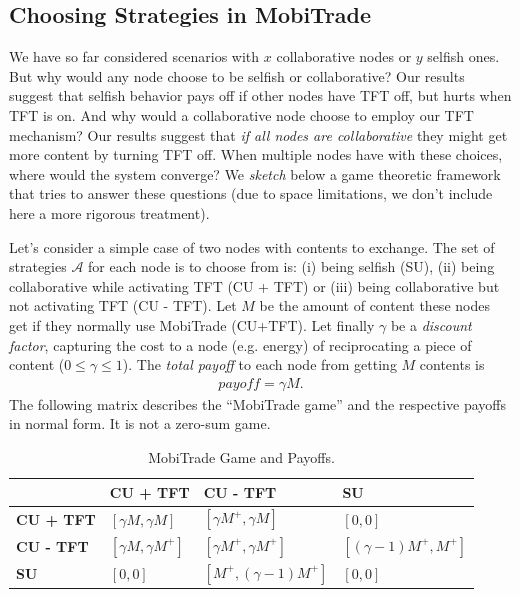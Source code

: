 \subsection{Choosing Strategies in MobiTrade}
\label{game}

We have so far considered scenarios with $x$ collaborative nodes or $y$ selfish ones. But why would any node choose to be selfish or collaborative? Our results suggest that selfish behavior pays off if other nodes have TFT off, but hurts when TFT is on. And why would a collaborative node choose to employ our TFT mechanism? Our results suggest that \emph{if all nodes are collaborative} they might get more content by turning TFT off. When multiple nodes have with these choices, where would the system converge? We \emph{sketch} below a game theoretic framework that tries to answer these questions (due to space limitations, we don't include here a more rigorous treatment).

Let's consider a simple case of two nodes with contents to exchange. The set of strategies $\mathcal{A}$ for each node is to choose from is: (i) being selfish (SU), (ii) being collaborative while activating TFT (CU + TFT) or (iii) being collaborative but not activating TFT (CU - TFT). Let $M$ be the amount of content these nodes get if they normally use MobiTrade (CU+TFT). Let finally $\gamma$ be a \emph{discount factor}, capturing the cost to a node (e.g. energy) of reciprocating a piece of content ($ 0 \le \gamma \le 1$).  The \emph{total payoff} to each node from getting $M$ contents is
\begin{eqnarray*}
payoff = \gamma M.
\end{eqnarray*}
The following matrix describes the ``MobiTrade game'' and the respective payoffs in normal form. It is not a zero-sum game.

\begin{table}[!h]
\vspace{-0.1in}
\caption{MobiTrade Game and Payoffs.}
\centering
\label{table:game}
\footnotesize
\begin{tabular}{|p{2cm}|p{2cm}|p{3cm}|p{3cm}|}
\hline
\bfseries & \bfseries CU + TFT & \bfseries CU - TFT  & \bfseries SU\\
\hline
\bfseries CU + TFT & $[\gamma M, \gamma M]$ & $[\gamma M^{+}, \gamma M]$ & $[0,0]$\\
\hline
\bfseries CU - TFT & $[\gamma M, \gamma M^{+}]$ & $[\gamma M^{+}, \gamma M^{+}]$ &$[(\gamma - 1) M^{+}, M^{+} ]$ \\
\hline
\bfseries SU &$[0, 0]$ &$[ M^{+}, (\gamma - 1) M^{+}]$ & $[0, 0]$\\
\hline
\end{tabular}
\end{table}

